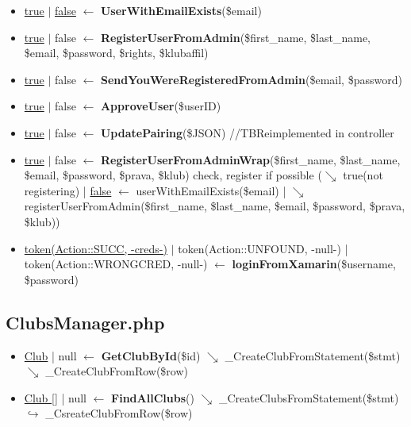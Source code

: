 \begin{itemize}
  \item \underline{true} $\vert$ \underline{false} $\leftarrow$ \textbf{UserWithEmailExists}(\$email)
  \item \underline{true} $\vert$ false $\leftarrow$ \textbf{RegisterUserFromAdmin}(\$first\_name, \$last\_name, \$email, \$password, \$rights, \$klubaffil)
  \item \underline{true} $\vert$ false $\leftarrow$ \textbf{SendYouWereRegisteredFromAdmin}(\$email, \$password)
  \item \underline{true} $\vert$ false $\leftarrow$ \textbf{ApproveUser}(\$userID)
  \item \underline{true} $\vert$ false $\leftarrow$ \textbf{UpdatePairing}(\$JSON) //TBReimplemented in controller
  \item \underline{true} $\vert$ false $\leftarrow$ \textbf{RegisterUserFromAdminWrap}(\$first\_name, \$last\_name, \$email, \$password, \$prava, \$klub) check, register if possible ($\searrow$ true(not registering) | \underline{false} $\leftarrow$ userWithEmailExists(\$email) | $\searrow$ registerUserFromAdmin(\$first\_name, \$last\_name, \$email, \$password, \$prava, \$klub))
  \item \underline{token(Action::SUCC, -creds-)} $\vert$ token(Action::UNFOUND, -null-) | token(Action::WRONGCRED, -null-) $\leftarrow$ \textbf{loginFromXamarin}(\$username, \$password)
\end{itemize}
\subsection{ClubsManager.php}
\begin{itemize}
  \setlength\itemsep{0em}
  \item \underline{Club} | null $\leftarrow$ \textbf{GetClubById}(\$id) $\searrow$ \_CreateClubFromStatement(\$stmt) $\searrow$ \_CreateClubFromRow(\$row)
  \item \underline{Club []} | null $\leftarrow$ \textbf{FindAllClubs}() $\searrow$ \_CreateClubsFromStatement(\$stmt) $\hookrightarrow$ \_CsreateClubFromRow(\$row)
\end{itemize}
